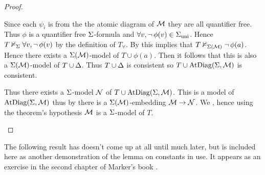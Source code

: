 \begin{proof}
\begin{backward}
        Since each $\psi_i$ is from the the atomic diagram of $\mathcal{M}$ 
        they are all quantifier free.
        Thus $\phi$ is a quantifier free $\Sigma$-formula and 
        $\forall v,  \neg\, \phi(v) \in {\Sigma}_\mathrm{uni}$.
        Hence $T \nvDash_{\Sigma} \forall v, \neg\, \phi(v)$ 
        by the definition of $T_\forall$.
        By 
        this implies that $T \nvDash_{\Sigma(\mathcal{M})} \neg\, \phi(a)$.
        Hence there exists a $\Sigma(\mathcal{M})$-model of $T \cup \phi(a)$.
        Then it follows that this is also a $\Sigma(\mathcal{M})$-model of $T \cup \Delta$.
        Thus $T \cup \Delta$ is consistent so
        $T \cup \mathrm{AtDiag}(\Sigma,\mathcal{M})$ is consistent.

        Thus there exists a $\Sigma$-model $\mathcal{N}$ of 
        $T \cup \mathrm{AtDiag}(\Sigma,\mathcal{M})$.
        This is a model of $\mathrm{AtDiag}(\Sigma,\mathcal{M})$ thus by 
        there is a $\Sigma(\mathcal{M})$-embedding $\mathcal{M} \to \mathcal{N}$.
        We , 
        hence using the theorem's hypothesis $\mathcal{M}$ is a $\Sigma$-model of $T$.
    \end{backward}
\end{proof}

The following result has doesn't come up at all until much later,
but is included here as another demonstration of the lemma on constants in use.
It appears as an exercise in the second chapter of Marker's book \cite{marker}.

